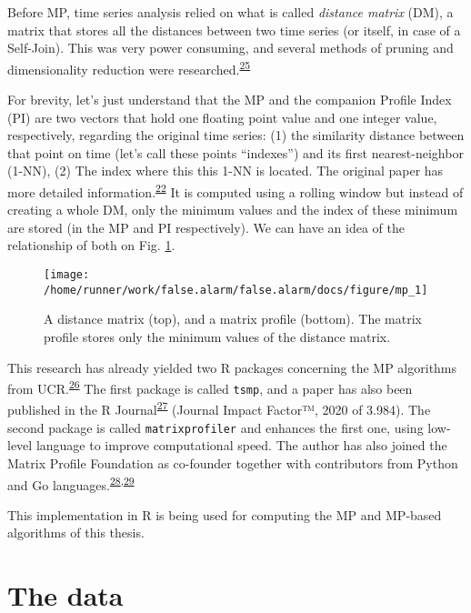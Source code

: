 \documentclass[12pt,twoside]{fmupthesis}
\begin{document}
Before MP, time series analysis relied on what is called \emph{distance matrix} (DM), a matrix that stores all
the distances between two time series (or itself, in case of a Self-Join). This was very power consuming,
and several methods of pruning and dimensionality reduction were researched.\textsuperscript{\protect\hyperlink{ref-Lin2007}{25}}

For brevity, let's just understand that the MP and the companion Profile Index (PI) are two vectors
that hold one floating point value and one integer value, respectively, regarding the original time
series: (1) the similarity distance between that point on time (let's call these points ``indexes'')
and its first nearest-neighbor (1-NN), (2) The index where this this 1-NN is located. The original
paper has more detailed information.\textsuperscript{\protect\hyperlink{ref-Yeh2017a}{22}} It is computed using a rolling window but instead
of creating a whole DM, only the minimum values and the index of these minimum are stored (in the
MP and PI respectively). We can have an idea of the relationship of both on Fig. \ref{fig:thematrix}.
\begin{figure}

{\centering \texttt{[image: /home/runner/work/false.alarm/false.alarm/docs/figure/mp\_1]} 

}

\caption{A distance matrix (top), and a matrix profile (bottom). The matrix profile stores only the minimum values of the distance matrix.}\label{fig:thematrix}
\end{figure}
This research has already yielded two R packages concerning the MP algorithms from UCR.\textsuperscript{\protect\hyperlink{ref-mpucr}{26}} The
first package is called \texttt{tsmp}, and a paper has also been published in the R Journal\textsuperscript{\protect\hyperlink{ref-RJ-2020-021}{27}}
(Journal Impact Factor™, 2020 of 3.984). The second package is called \texttt{matrixprofiler} and enhances
the first one, using low-level language to improve computational speed. The author has also joined
the Matrix Profile Foundation as co-founder together with contributors from Python and Go languages.\textsuperscript{\protect\hyperlink{ref-mpf2020}{28},\protect\hyperlink{ref-VanBenschoten2020}{29}}

This implementation in R is being used for computing the MP and MP-based algorithms of this thesis.

\hypertarget{the-data}{%
\section{The data}\label{the-data}}
\end{document}
